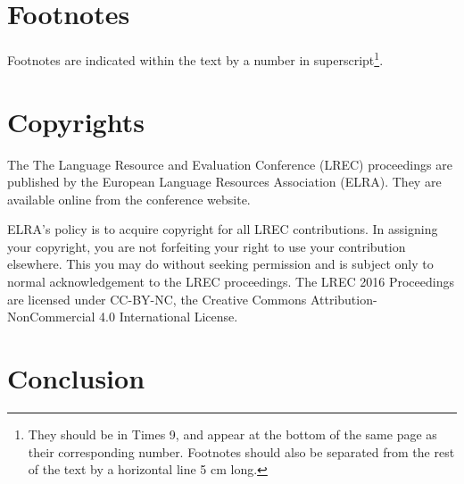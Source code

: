 \documentclass[10pt, a4paper]{article}
\begin{document}
%
%
%
%
%

\section{Footnotes}

Footnotes are indicated within the text by a number in superscript\footnote{They
should be in Times 9, and appear at the bottom of the same page as their
corresponding number. Footnotes should also be separated from the rest of the
text by a horizontal line 5 cm long.}.

\section{Copyrights}

The The Lan\-gua\-ge Re\-sour\-ce and Evalua\-tion Con\-fe\-rence (LREC)
proceedings are published by the European Language Resources Association (ELRA).
They are available online from the conference website.


ELRA's policy is to acquire copyright for all LREC contributions. In assigning
your copyright, you are not forfeiting your right to use your contribution
elsewhere. This you may do without seeking permission and is subject only to
normal acknowledgement to the LREC proceedings. The LREC 2016 Proceedings are
licensed under CC-BY-NC, the Creative Commons Attribution-NonCommercial 4.0
International License.

\section{Conclusion}
\end{document}
